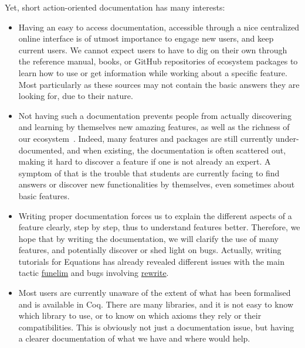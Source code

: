 \documentclass{easychair}
\begin{document}
Yet, short action-oriented documentation has many interests:
\begin{itemize}[itemsep=0pt]
  \item Having an easy to access documentation, accessible through a nice
        centralized online interface is of utmost importance to engage new
        users, and keep current users.
        We cannot expect users to have to dig on their own through the
        reference manual, books, or GitHub repositories of ecosystem packages to learn how to use or
        get information while working about a specific feature.
        Most particularly as these sources may not contain the basic answers
        they are looking for, due to their nature.
  \item Not having such a documentation prevents people from actually
        discovering and learning by themselves new amazing features, as well as
        the richness of our ecosystem~\cite{appel2022coq}.
        Indeed, many features and packages are still currently under-documented, and
        when existing, the documentation is often scattered out, making it hard
        to discover a feature if one is not already an expert.
        A symptom of that is the trouble that students are currently facing to
        find answers or discover new functionalities by themselves, even sometimes
        about basic features.
  \item Writing proper documentation forces us to explain the different aspects
        of a feature clearly, step by step, thus to understand features better.
        Therefore, we hope that by writing the documentation, we will clarify
        the use of many features, and potentially discover or shed light on bugs.
        Actually, writing tutorials for Equations has already revealed different
        issues with the main tactic \href{https://github.com/Zimmi48/platform-docs/pull/1}{funelim}
        and bugs involving \href{https://coq.zulipchat.com/#narrow/stream/237659-Equations-devs-.26-users/topic/Bug.20funelim.20on.20Ack}{rewrite}.
  \item Most users are currently unaware of the extent of what has been
        formalised and is available in Coq.
        There are many libraries, and it is not easy to know which library to
        use, or to know on which axioms they rely or their compatibilities.
        This is obviously not just a documentation issue, but having a clearer
        documentation of what we have and where would help.
\end{itemize}
\end{document}
